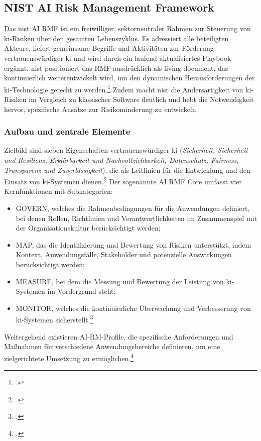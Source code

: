 \subsection{NIST AI Risk Management Framework}
\label{subsec:nist}
Das \ac{nist} AI RMF ist ein freiwilliger, sektorneutraler Rahmen zur Steuerung von \ac{ki}-Risiken über den gesamten Lebenszyklus.
Es adressiert alle beteiligten Akteure, liefert gemeinsame Begriffe und Aktivitäten zur Förderung vertrauenswürdiger \ac{ki} und wird durch ein laufend aktualisiertes Playbook ergänzt.
\ac{nist} positioniert das RMF ausdrücklich als \glqq{}living document\grqq{}, das kontinuierlich weiterentwickelt wird, um den dynamischen Herausforderungen der \ac{ki}-Technologie gerecht zu werden.\footcite[1-3]{nationalinstituteofstandardsandtechnologyAIRiskManagement2021}
Zudem macht \ac{nist} die Andersartigkeit von \ac{ki}-Risiken im Vergleich zu klassischer Software deutlich und hebt die Notwendigkeit hervor, spezifische Ansätze zur Risikominderung zu entwickeln.

\subsubsection{Aufbau und zentrale Elemente}
\label{subsubsec:nist_aufbau}
Zielbild sind sieben Eigenschaften vertrauenswürdiger \ac{ki} (\textit{Sicherheit, Sicherheit und Resilienz, Erklärbarkeit und Nachvollziehbarkeit, Datenschutz, Fairness, Transparenz und Zuverlässigkeit}), die als Leitlinien für die Entwicklung und den Einsatz von \ac{ki}-Systemen dienen.\footcite[12-18]{nationalinstituteofstandardsandtechnologyAIRiskManagement2021}
Der sogenannte AI RMF Core umfasst vier Kernfunktionen mit Subkategorien:
\begin{itemize}
    \item GOVERN, welches die Rahmenbedingungen für die Anwendungen definiert, bei denen Rollen, Richtlinien und Verantwortlichkeiten im Zusammenspiel mit der Organisationskultur berücksichtigt werden;
    \item MAP, das die Identifizierung und Bewertung von Risiken unterstützt, indem Kontext, Anwendungsfälle, Stakeholder und potenzielle Auswirkungen berücksichtigt werden;
    \item MEASURE, bei dem die Messung und Bewertung der Leistung von \ac{ki}-Systemen im Vordergrund steht;
    \item MONITOR, welches die kontinuierliche Überwachung und Verbesserung von \ac{ki}-Systemen sicherstellt.\footcite[20-31]{nationalinstituteofstandardsandtechnologyAIRiskManagement2021}
\end{itemize}
Weitergehend existieren AI-RM-Profile, die spezifische Anforderungen und Maßnahmen für verschiedene Anwendungsbereiche definieren, um eine zielgerichtete Umsetzung zu ermöglichen.\footcite[33-34]{nationalinstituteofstandardsandtechnologyAIRiskManagement2021}

